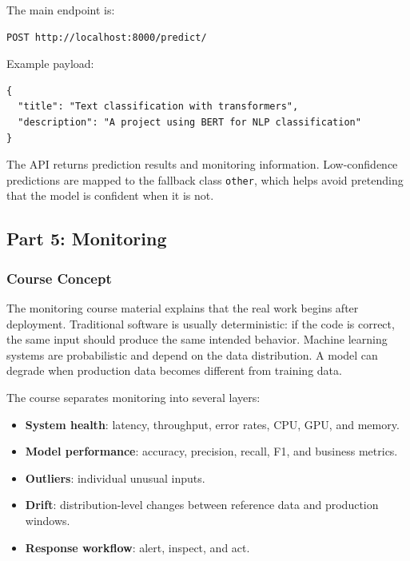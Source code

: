 \documentclass[11pt,a4paper]{article}
\begin{document}
The main endpoint is:

\begin{lstlisting}[style=projectcode]
POST http://localhost:8000/predict/
\end{lstlisting}

Example payload:

\begin{lstlisting}[style=projectcode]
{
  "title": "Text classification with transformers",
  "description": "A project using BERT for NLP classification"
}
\end{lstlisting}

The API returns prediction results and monitoring information. Low-confidence predictions are mapped to the fallback class \texttt{other}, which helps avoid pretending that the model is confident when it is not.

\subsection{Part 5: Monitoring}

\subsubsection{Course Concept}

The monitoring course material explains that the real work begins after deployment. Traditional software is usually deterministic: if the code is correct, the same input should produce the same intended behavior. Machine learning systems are probabilistic and depend on the data distribution. A model can degrade when production data becomes different from training data.

The course separates monitoring into several layers:

\begin{itemize}
    \item \textbf{System health}: latency, throughput, error rates, CPU, GPU, and memory.
    \item \textbf{Model performance}: accuracy, precision, recall, F1, and business metrics.
    \item \textbf{Outliers}: individual unusual inputs.
    \item \textbf{Drift}: distribution-level changes between reference data and production windows.
    \item \textbf{Response workflow}: alert, inspect, and act.
\end{itemize}
\end{document}
